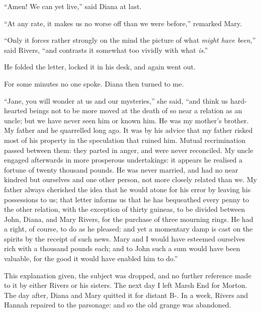\enquote{Amen! We can yet live,} said Diana at last.

\enquote{At any rate, it makes us no worse off than we were before,}
remarked Mary.

\enquote{Only it forces rather strongly on the mind the picture of what
	\emph{might have been},} said \Mr{} Rivers, \enquote{and contrasts it somewhat
	too vividly with what \emph{is}.}

He folded the letter, locked it in his desk, and again went out.

For some minutes no one spoke. Diana then turned to me.

\enquote{Jane, you will wonder at us and our mysteries,} she said,
\enquote{and think us hard-hearted beings not to be more moved at the
	death of so near a relation as an uncle; but we have never seen him or
	known him. He was my mother's brother. My father and he quarrelled
	long ago. It was by his advice that my father risked most of his
	property in the speculation that ruined him. Mutual recrimination
	passed between them: they parted in anger, and were never reconciled.
	My uncle engaged afterwards in more prosperous undertakings: it appears
	he realised a fortune of twenty thousand pounds. He was never married,
	and had no near kindred but ourselves and one other person, not more
	closely related than we. My father always cherished the idea that he
	would atone for his error by leaving his possessions to us; that letter
	informs us that he has bequeathed every penny to the other relation,
	with the exception of thirty guineas, to be divided between \St{} John,
	Diana, and Mary Rivers, for the purchase of three mourning rings. He
	had a right, of course, to do as he pleased: and yet a momentary damp is
	cast on the spirits by the receipt of such news. Mary and I would have
	esteemed ourselves rich with a thousand pounds each; and to \St{} John
	such a sum would have been valuable, for the good it would have enabled
	him to do.}

This explanation given, the subject was dropped, and no further
reference made to it by either \Mr{} Rivers or his sisters. The next day
I left Marsh End for Morton. The day after, Diana and Mary quitted it
for distant B-. In a week, \Mr{} Rivers and Hannah repaired to the
parsonage: and so the old grange was abandoned.
